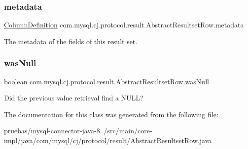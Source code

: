 \subsubsection{\texorpdfstring{metadata}{metadata}}
{\footnotesize\ttfamily \mbox{\hyperlink{interfacecom_1_1mysql_1_1cj_1_1protocol_1_1_column_definition}{Column\+Definition}} com.\+mysql.\+cj.\+protocol.\+result.\+Abstract\+Resultset\+Row.\+metadata\hspace{0.3cm}{\ttfamily [protected]}}

The metadata of the fields of this result set. \mbox{\label{classcom_1_1mysql_1_1cj_1_1protocol_1_1result_1_1_abstract_resultset_row_a26e909a488abbe6e233b88a5f7e72dab}} 
\subsubsection{\texorpdfstring{was\+Null}{wasNull}}
{\footnotesize\ttfamily boolean com.\+mysql.\+cj.\+protocol.\+result.\+Abstract\+Resultset\+Row.\+was\+Null\hspace{0.3cm}{\ttfamily [protected]}}

Did the previous value retrieval find a N\+U\+LL? 

The documentation for this class was generated from the following file\+:\begin{DoxyCompactItemize}
\item 
pruebas/mysql-\/connector-\/java-\/8../src/main/core-\/impl/java/com/mysql/cj/protocol/result/Abstract\+Resultset\+Row.\+java\end{DoxyCompactItemize}

